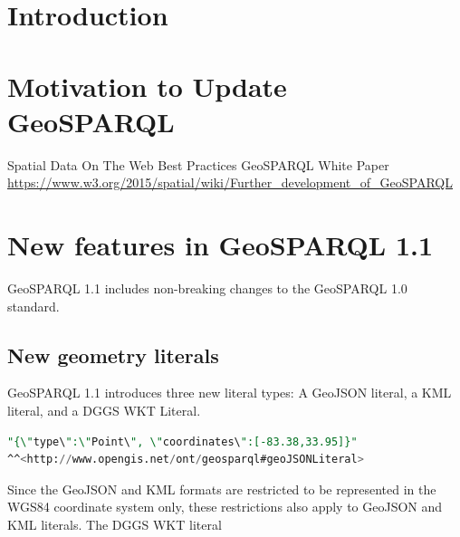 \documentclass[runningheads]{llncs}
\begin{document}
\section{Introduction}
\label{sec:introduction}
\section{Motivation to Update GeoSPARQL}
\label{sec:motivation}
Spatial Data On The Web Best Practices \cite{van2019best}
GeoSPARQL White Paper \cite{geosparqlwhitepaper}
\href{https://www.w3.org/2015/spatial/wiki/Further_development_of_GeoSPARQL}{https://www.w3.org/2015/spatial/wiki/Further\_development\_of\_GeoSPARQL}
\section{New features in GeoSPARQL 1.1}
\label{sec:newfeatures}
GeoSPARQL 1.1 includes non-breaking changes to the GeoSPARQL 1.0 standard.
\subsection{New geometry literals}
\label{sec:literals}
GeoSPARQL 1.1 introduces three new literal types: A GeoJSON\cite{butler2016geojson} literal, a KML\cite{nolan2014keyhole} literal, and a DGGS\cite{sahr1998discrete} WKT Literal.
\small
\begin{lstlisting}[caption=GeoJSON literal example,label=lst:geojsonliteral,language=sql,frame=single,basicstyle=\ttfamily]
"{\"type\":\"Point\", \"coordinates\":[-83.38,33.95]}"
^^<http://www.opengis.net/ont/geosparql#geoJSONLiteral>
\end{lstlisting}
\normalsize
Since the GeoJSON and KML formats are restricted to be represented in the WGS84 coordinate system only, these restrictions also apply to GeoJSON and KML literals. The DGGS WKT literal  
\end{document}
